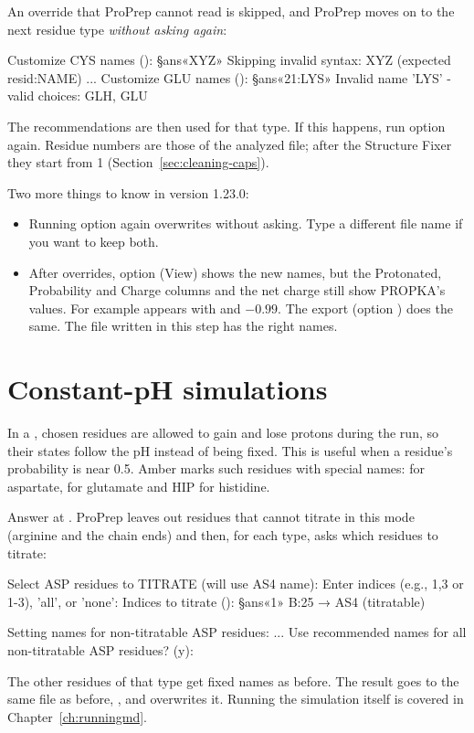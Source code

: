 \begin{watchout}
An override that ProPrep cannot read is skipped, and ProPrep moves on to the
next residue type \emph{without asking again}:
\begin{screen}
Customize CYS names (): §ans«XYZ»
Skipping invalid syntax: XYZ (expected resid:NAME)
...
Customize GLU names (): §ans«21:LYS»
Invalid name 'LYS' - valid choices: GLH, GLU
\end{screen}
The recommendations are then used for that type. If this happens, run option
 again. Residue numbers are those of the analyzed file; after the
Structure Fixer they start from 1 (Section~\ref{sec:cleaning-caps}).
\end{watchout}

\begin{watchout}
Two more things to know in version 1.23.0:
\begin{itemize}
  \item Running option  again overwrites
         without asking. Type a different
        file name if you want to keep both.
  \item After overrides, option  (View) shows the new names, but the
        Protonated, Probability and Charge columns and the net charge still
        show PROPKA's values. For example  appears with
         and $-0.99$. The export (option ) does the same.
        The file written in this step has the right names.
\end{itemize}
\end{watchout}

\section{Constant-pH simulations}
\label{sec:protonation-cph}

In a , chosen residues are allowed to gain and
lose protons during the run, so their states follow the pH instead of being
fixed. This is useful when a residue's probability is near 0.5. Amber marks
such residues with special names:  for aspartate,  for
glutamate and HIP for histidine.

Answer  at . ProPrep leaves
out residues that cannot titrate in this mode (arginine and the chain ends) and
then, for each type, asks which residues to titrate:
\begin{screen}
Select ASP residues to TITRATE (will use AS4 name):
Enter indices (e.g., 1,3 or 1-3), 'all', or 'none':
Indices to titrate (): §ans«1»
  B:25 → AS4 (titratable)

Setting names for non-titratable ASP residues:
...
Use recommended names for all non-titratable ASP residues? (y):
\end{screen}
The other residues of that type get fixed names as before. The result goes to
the same file as before,
, and overwrites it. Running the simulation itself is covered in
Chapter~\ref{ch:runningmd}.

